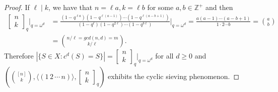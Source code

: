 \documentclass[addpoints,10pt]{exam}
\theoremstyle{plain}
\theoremstyle{definition}
\theoremstyle{plain}
\theoremstyle{plain}
\theoremstyle{definition}
\newcommand{\ZZ}{\ensuremath{\mathbb{Z}}}
\begin{document}
\begin{proof}
If \(\ell\mid k\), we have that $n=\ell a, k=\ell b$ for some $a,b\in \ZZ^{+}$ and then
\begin{align*}
\begin{bmatrix}n\\ k\end{bmatrix}_{q}\Big|_{q=\omega^d}
&=
\frac{(1-q^{\ell a})(1-q^{\ell(a-1)})\cdots(1-q^{\ell(a-b+1)})}
{(1-q^\ell)(1-q^{2\ell})\cdots(1-q^{b\ell})}\Bigg|_{q=\omega^d}=
\frac{a(a-1)\cdots(a-b+1)}
{1\cdot2\cdots b} = \binom{a}{b}\\
&= \binom{n/\ell=gcd(n,d)=m}{k/\ell}.
\end{align*}
Therefore
$
\left|\{S\in X:c^d(S)=S\}\right|
=
\begin{bmatrix}n\\ k\end{bmatrix}_{q}\Big|_{q=\omega^d}
$ for all \(d\geq 0\) and
$
(
\binom{[n]}{k},
\langle(1\,2\,\cdots\,n)\rangle,
\begin{bmatrix}n\\ k\end{bmatrix}_{q}
)
$ exhibits the cyclic sieving phenomenon.

\end{proof}
\end{document}
